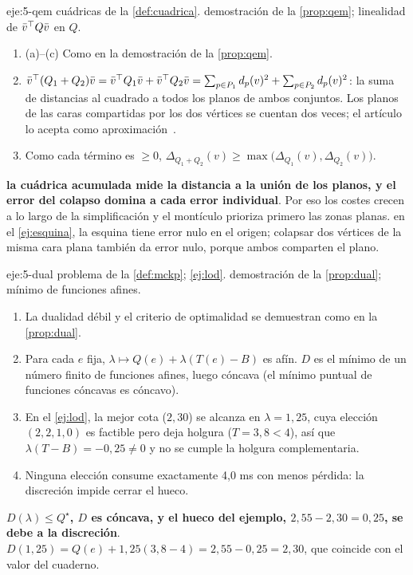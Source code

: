 \begin{solucion}{eje:5-qem}
\datos cuádricas de la \cref{def:cuadrica}.
\planteamiento demostración de la \cref{prop:qem}; linealidad de $\bar v^\top Q\bar v$ en $Q$.
\pasos
\begin{enumerate}[label=\arabic*.]
  \item (a)--(c) Como en la demostración de la \cref{prop:qem}.
  \item $\bar v^\top(Q_1+Q_2)\bar v=\bar v^\top Q_1\bar v+\bar v^\top Q_2\bar v=\sum_{p\in P_1}d_p(v)^2+\sum_{p\in P_2}d_p(v)^2$: la suma de distancias al cuadrado a todos los planos de ambos conjuntos. Los planos de las caras compartidas por los dos vértices se cuentan dos veces; el artículo lo acepta como aproximación~\cite[§5]{garland}.
  \item Como cada término es $\ge 0$, $\Delta_{Q_1+Q_2}(v)\ge\max\bigl(\Delta_{Q_1}(v),\Delta_{Q_2}(v)\bigr)$.
\end{enumerate}
\resultado \textbf{la cuádrica acumulada mide la distancia a la unión de los planos, y el error del colapso domina a cada error individual}. Por eso los costes crecen a lo largo de la simplificación y el montículo prioriza primero las zonas planas.
\comprobacion en el \cref{ej:esquina}, la esquina tiene error nulo en el origen; colapsar dos vértices de la misma cara plana también da error nulo, porque ambos comparten el plano.
\end{solucion}

\begin{solucion}{eje:5-dual}
\datos problema de la \cref{def:mckp}; \cref{ej:lod}.
\planteamiento demostración de la \cref{prop:dual}; mínimo de funciones afines.
\pasos
\begin{enumerate}[label=\arabic*.]
  \item La dualidad débil y el criterio de optimalidad se demuestran como en la \cref{prop:dual}.
  \item Para cada $e$ fija, $\lambda\mapsto Q(e)+\lambda(T(e)-B)$ es afín. $D$ es el mínimo de un número finito de funciones afines, luego cóncava (el mínimo puntual de funciones cóncavas es cóncavo).
  \item En el \cref{ej:lod}, la mejor cota ($2{,}30$) se alcanza en $\lambda=1{,}25$, cuya elección $(2,2,1,0)$ es factible pero deja holgura ($T=3{,}8<4$), así que $\lambda(T-B)=-0{,}25\ne 0$ y no se cumple la holgura complementaria.
  \item Ninguna elección consume exactamente 4,0 ms con menos pérdida: la discreción impide cerrar el hueco.
\end{enumerate}
\resultado \textbf{$D(\lambda)\le Q^\star$, $D$ es cóncava, y el hueco del ejemplo, $2{,}55-2{,}30=0{,}25$, se debe a la discreción}.
\comprobacion $D(1{,}25)=Q(e)+1{,}25(3{,}8-4)=2{,}55-0{,}25=2{,}30$, que coincide con el valor del cuaderno.
\end{solucion}

